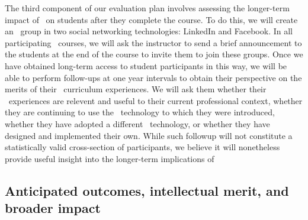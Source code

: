 The third component of our evaluation plan involves assessing the
longer-term impact of \eCT\ on students after they complete the course. To
do this, we will create an \eCT\ group in two social networking
technologies: LinkedIn and Facebook.  In all participating \eCT\ courses,
we will ask the instructor to send a brief announcement to the students at
the end of the course to invite them to join these groups.  Once we have
obtained long-term access to student participants in this way, we will be
able to perform follow-ups at one year intervals to obtain their
perspective on the merits of their \eCT\ curriculum experiences. We will
ask them whether their \eCT\ experiences are relevent and useful to their
current professional context, whether they are continuing to use the \eCT\
technology to which they were introduced, whether they have adopted a
different \eCT\ technology, or whether they have designed and implemented
their own.  While such followup will not constitute a statistically valid
cross-section of participants, we believe it will nonetheless provide
useful insight into the longer-term implications of

\subsection{Anticipated outcomes, intellectual merit, and broader impact}
\label{sec:anticipated-outcomes}

